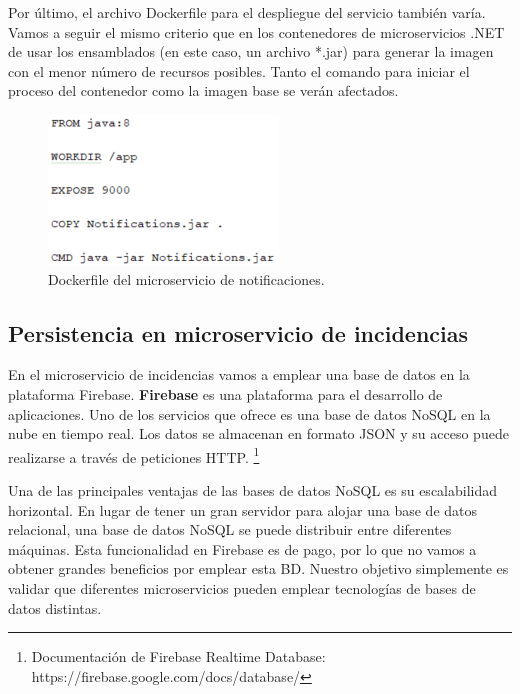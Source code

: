 \documentclass[11pt,spanish,listoffigures]{tfgetsinf}
\begin{document}
Por último, el archivo Dockerfile para el despliegue del servicio también varía. Vamos a seguir el mismo criterio que en los contenedores de microservicios .NET de usar los ensamblados (en este caso, un archivo *.jar) para generar la imagen con el menor número de recursos posibles. Tanto el comando para iniciar el proceso del contenedor como la imagen base se verán afectados.

\begin{figure}[h]
\centering
\includegraphics[scale=1]{JavaDockerfile}
\caption{Dockerfile del microservicio de notificaciones.}
\end{figure}

\newpage


\subsection{Persistencia en microservicio de incidencias}

En el microservicio de incidencias vamos a emplear una base de datos en la plataforma Firebase. \textbf{Firebase} es una plataforma para el desarrollo de aplicaciones. Uno de los servicios que ofrece es una base de datos NoSQL en la nube en tiempo real. Los datos se almacenan en formato JSON y su acceso puede realizarse a través de peticiones HTTP. \footnote{ Documentación de Firebase Realtime Database: https://firebase.google.com/docs/database/} 

Una de las principales ventajas de las bases de datos NoSQL es su escalabilidad horizontal. En lugar de tener un gran servidor para alojar una base de datos relacional, una base de datos NoSQL se puede distribuir entre diferentes máquinas. Esta funcionalidad en Firebase es de pago, por lo que no vamos a obtener grandes beneficios por emplear esta BD. Nuestro objetivo simplemente es validar que diferentes microservicios pueden emplear tecnologías de bases de datos distintas.
\end{document}
